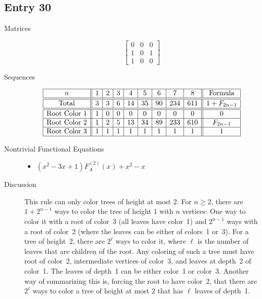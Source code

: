 \documentclass[12pt]{amsart}
\newcommand{\gff}[2]{F_{#2}^{(#1)}(x)}
\newcommand{\gfa}[1]{\gff{#1}{A}}
\begin{document}
\subsection*{Entry 30}
\begin{description}
    \item[Matrices]
    
    \[\begin{bmatrix}
0 & 0 & 0 \\
1 & 0 & 1 \\
1 & 0 & 0
\end{bmatrix}\]
    \item[Sequences]\hspace*{\fill}\vspace{-0.5cm}
    \begin{center}
        \[
        \begin{array}{|c||c|c|c|c|c|c|c|c||c|}\hline
           n  & 1 & 2 & 3 & 4 & 5 & 6 & 7 & 8  & \text{Formula}\\\hline\hline
           \text{Total}  & 3 & 3 & 6 & 14 & 35 & 90 & 234 & 611 & 
           1+F_{2n-1} \\\hline\hline
           \text{Root Color }1 & 1 & 0 & 0 & 0 & 0 & 0 & 0 & 0 & 0\\\hline
           \text{Root Color }2 & 1 & 2 & 5 & 13 & 34 & 89 & 233 & 610 & F_{2n-1}\\\hline
           \text{Root Color }3 & 1 & 1 & 1 & 1 & 1 & 1 & 1 & 1 & 1\\\hline
        \end{array}
        \]
    \end{center}
    
    \item[Nontrivial Functional Equations]\hspace*{\fill}

    \begin{itemize}
\item $(x^2 - 3x + 1)\gfa{2}+x^2 - x$




\end{itemize}
    \item[Discussion] This rule can only color trees of height at most $2$. For $n\geq2$, there are $1+2^{n-1}$ ways to color the tree of height $1$ with $n$ vertices: One way to color it with a root of color~3 (all leaves have color~1) and $2^{n-1}$ ways with a root of color~2 (where the leaves can be either of colors~1 or~3). For a tree of height~2, there are $2^{\ell}$ ways to color it, where $\ell$ is the number of leaves that are children of the root. Any coloring of such a tree must have root of color~2, intermediate vertices of color~3, and leaves at depth~2 of color~1. The leaves of depth~1 can be either color~1 or color~3. Another way of summarizing this is, forcing the root to have color~2, that there are $2^\ell$ ways to color a tree of height at most $2$ that has $\ell$ leaves of depth~1.


\end{description}
\end{document}

